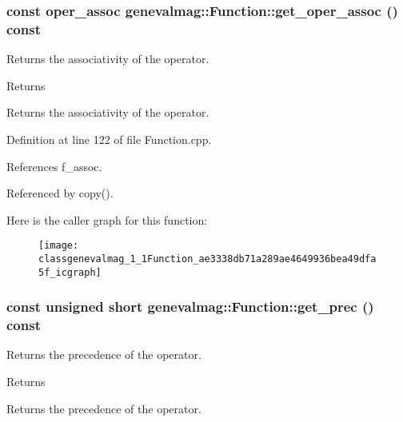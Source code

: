\hypertarget{classgenevalmag_1_1Function_ae3338db71a289ae4649936bea49dfa5f}{
\subsubsection[{get\_\-oper\_\-assoc}]{\setlength{\rightskip}{0pt plus 5cm}const {\bf oper\_\-assoc} genevalmag::Function::get\_\-oper\_\-assoc () const}}
\label{classgenevalmag_1_1Function_ae3338db71a289ae4649936bea49dfa5f}
Returns the associativity of the operator. \begin{DoxyReturn}{Returns}

\end{DoxyReturn}
Returns the associativity of the operator. 

Definition at line 122 of file Function.cpp.



References f\_\-assoc.



Referenced by copy().



Here is the caller graph for this function:\nopagebreak
\begin{figure}[H]
\begin{center}
\leavevmode
\texttt{[image: classgenevalmag\_1\_1Function\_ae3338db71a289ae4649936bea49dfa5f\_icgraph]}
\end{center}
\end{figure}


\hypertarget{classgenevalmag_1_1Function_a31272821c5ad532ada3b3d8a988f5891}{
\subsubsection[{get\_\-prec}]{\setlength{\rightskip}{0pt plus 5cm}const unsigned short genevalmag::Function::get\_\-prec () const}}
\label{classgenevalmag_1_1Function_a31272821c5ad532ada3b3d8a988f5891}
Returns the precedence of the operator. \begin{DoxyReturn}{Returns}

\end{DoxyReturn}
Returns the precedence of the operator. 

